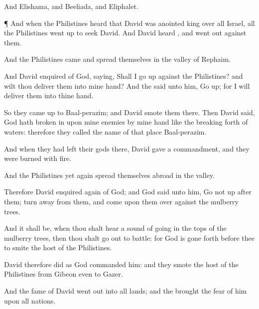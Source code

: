 {And
Elishama, and
Beeliada, and
Eliphalet.


\par }{\PP {}¶ And when the
Philistines
heard that
David was
anointed
king over all
Israel, all the
Philistines went
up to
seek
David. And
David
heard
{}, and went
out
against them.

And the
Philistines
came and
spread themselves in the
valley of
Rephaim.

And
David
enquired of
God,
saying, Shall I go
up against the
Philistines? and wilt thou
deliver them into mine
hand? And the
{}
said unto him, Go
up; for I will
deliver them into thine
hand.

So they came
up to
Baal-perazim; and
David
smote them there. Then
David
said,
God hath broken
in upon mine
enemies by mine
hand like the breaking
forth of
waters: therefore they
called the
name of that
place
Baal-perazim.

And when they had
left their
gods there,
David gave a
commandment, and they were
burned with
fire.

And the
Philistines yet
again spread themselves
abroad in the
valley.

Therefore
David
enquired again of
God; and
God
said unto him, Go not
up
after them; turn
away from them, and
come upon them over
against the mulberry
trees.

And it shall be, when thou shalt
hear a
sound of
going in the
tops of the mulberry
trees,
{} then thou shalt go
out to
battle: for
God is gone
forth
before thee to
smite the
host of the
Philistines.

David therefore
did as
God
commanded him: and they
smote the
host of the
Philistines from
Gibeon even to
Gazer.

And the
fame of
David went
out into all
lands; and the
{}
brought the
fear of him upon all
nations.




\par }
